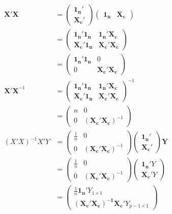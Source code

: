 \documentclass[a4paper]{article}
\begin{document}
\begin{align*}
\mathbf{X'X} &= \begin{pmatrix}
\mathbf{1_n}'\\
\mathbf{X_c}'
\end{pmatrix} \begin{pmatrix}
\mathbf{1_n} & \mathbf{X_c}
\end{pmatrix}\\
&= \begin{pmatrix}
\mathbf{1_n}' \mathbf{1_n} & \mathbf{1_n'X_c}\\
\mathbf{X_c'1_n} & \mathbf{X_c'X_c}
\end{pmatrix}\\
&= \begin{pmatrix}
\mathbf{1_n}' \mathbf{1_n} & 0\\
0 & \mathbf{X_c'X_c}
\end{pmatrix}\\
\mathbf{X'X}^{-1} &= \begin{pmatrix}
\mathbf{1_n}' \mathbf{1_n} & \mathbf{1_n'X_c}\\
\mathbf{X_c'1_n} & \mathbf{X_c'X_c}
\end{pmatrix}^{-1}\\
&= \begin{pmatrix}
n & 0\\
0 & (\mathbf{X_c'X_c})^{-1}
\end{pmatrix}\\
(X'X)^{-1}X'Y &= \begin{pmatrix}
\frac{1}{n} & 0\\
0 & (\mathbf{X_c'X_c})^{-1}
\end{pmatrix}\begin{pmatrix}
\mathbf{1_n}'\\
\mathbf{X_c}'
\end{pmatrix}\mathbf{Y}\\
&= \begin{pmatrix}
\frac{1}{n} & 0\\
0 & (\mathbf{X_c'X_c})^{-1}
\end{pmatrix}\begin{pmatrix}
\mathbf{1_n}'Y\\
\mathbf{X_c}'Y
\end{pmatrix}\\
&= \begin{pmatrix}
\frac{1}{n}\mathbf{1_n}'Y_{1 \times 1}\\
\mathbf{(X_c'X_c)^{-1}X_c}'Y_{p-1 \times 1}
\end{pmatrix}\\

\end{align*}
\end{document}
